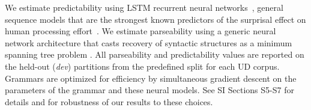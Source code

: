 \documentclass[9pt,twocolumn,twoside,lineno]{pnas-new}
\begin{document}
{%
We estimate predictability using LSTM recurrent neural networks~\citep{hochreiter1997long}, general sequence models that are the strongest known predictors of the surprisal effect on human processing effort~\citep{frank2011insensitivity,goodkind2018predictive}.
We estimate parseability using a generic neural network architecture that casts recovery of syntactic structures as a minimum spanning tree problem \citep{dozat2017stanford, zhang2017dependency}.
All parseability and predictability values are reported on the held-out (\emph{dev}) partitions from the predefined split for each UD corpus.
Grammars are optimized for efficiency by simultaneous gradient descent on the parameters of the grammar and these neural models.
See SI Sections S5-S7 for details and for robustness of our results to these choices.



%



}
\end{document}
